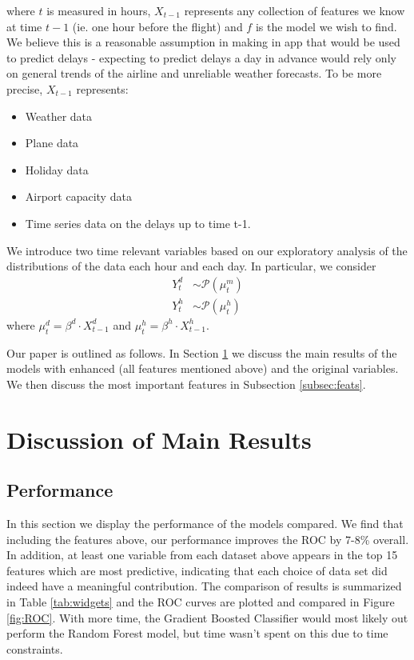 \documentclass[twocolumn,showpacs,%
  nofootinbib,aps,superscriptaddress,%
  eqsecnum,prd,notitlepage,showkeys,10pt]{revtex4-1}
\begin{document}
where $t$ is measured in hours, $X_{t-1}$ represents any collection of features we know at time $t-1$ (ie. one hour before the flight) and $f$ is the model we wish to find. 
We believe this is a reasonable assumption in making
in app that would be used to predict delays - expecting to predict delays a day in advance would rely only on general trends of the airline and unreliable weather forecasts. To be more precise, $X_{t-1}$ represents:
\begin{itemize}
\item Weather data \cite{weather}
\item Plane data \cite{aviation}
\item Holiday data 
\item Airport capacity data \cite{boarding}
\item Time series data on the delays up to time t-1. \cite{airline2}
\end{itemize}
We introduce two time relevant variables based on our exploratory analysis of the distributions of the data each hour and each day. In particular, we consider 
\begin{align} Y_t^{d} &\sim \mathcal{P}(\mu_t^m)\\
Y_t^{h} &\sim \mathcal{P}(\mu_t^h)
\end{align}
where $\mu_t^d = \beta^d \cdot X_{t-1}^d$ and $\mu_t^h= \beta^h \cdot X_{t-1}^h$.

Our paper is outlined as follows. In Section \ref{sec:main} we discuss the main results of the models with enhanced (all features mentioned above)  and the original variables. We then discuss
the most important features in Subsection \ref{subsec:feats}.

\section{Discussion of Main Results}
\label{sec:main}

\subsection{Performance}


In this section we display the performance of the models compared. We find that including the features above, our performance improves the ROC by 7-8\% overall. In addition, at least one variable from each dataset above appears in the top 15
features which are most predictive, indicating that each choice of data set did indeed have a meaningful contribution. The comparison of results is summarized in Table \ref{tab:widgets} and the ROC curves are plotted and compared in Figure \ref{fig:ROC}. With more time, the Gradient Boosted Classifier would most likely out perform the Random Forest model, but time wasn't spent on this due to time constraints. 
\end{document}
